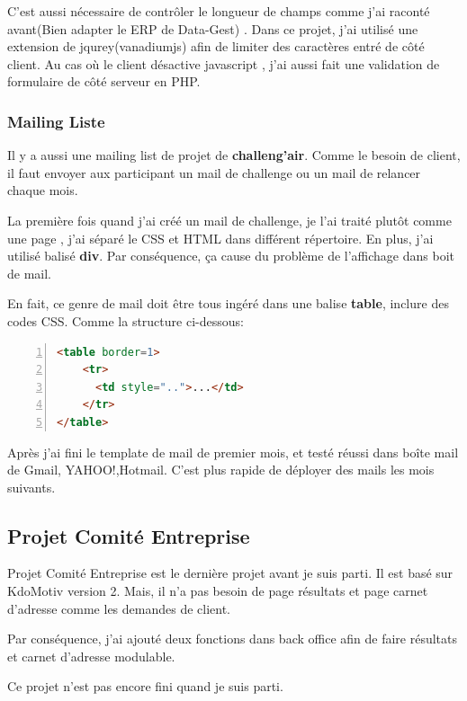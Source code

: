 C'est aussi nécessaire de contrôler le longueur de champs comme j'ai raconté avant(Bien adapter le ERP de Data-Gest) . Dans ce projet, j'ai utilisé une extension de jqurey(vanadiumjs) afin de limiter des caractères entré de côté client. Au cas où le client désactive javascript , j'ai aussi fait une validation de formulaire de côté serveur en PHP.

\subsubsection{Mailing Liste}
Il y a aussi une mailing list de projet de \textbf{challeng'air}. Comme le besoin de client, il faut envoyer aux participant un  mail de challenge ou un mail de relancer chaque mois. 

La première fois quand j'ai créé un mail de challenge, je l'ai traité plutôt comme une page , j'ai séparé le CSS et  HTML dans différent répertoire. En plus, j'ai utilisé balisé \textbf{div}. Par conséquence, ça cause du problème de l'affichage dans boit de mail.

En fait, ce genre de mail doit être tous ingéré dans une balise \textbf{table}, inclure des codes CSS. Comme la structure ci-dessous:
\begin{lstlisting}[language= html, numbers=left, numberstyle=\tiny,  frame=shadowbox]
<table border=1>
	<tr>
      <td style="..">...</td>
    </tr> 
</table>
\end{lstlisting}

Après j'ai fini le template de mail de premier mois, et testé réussi dans boîte mail de Gmail, YAHOO!,Hotmail. C'est plus rapide de déployer des mails les mois suivants. 
   
\subsection{Projet Comité Entreprise}
Projet Comité Entreprise est le dernière projet avant je suis parti. Il est basé sur KdoMotiv version 2. Mais, il n'a pas besoin de page résultats et page carnet d'adresse comme les demandes de client.  

Par conséquence, j'ai ajouté deux fonctions dans back office afin de faire résultats et carnet d'adresse modulable. 

Ce projet n'est pas encore fini quand je suis parti.




